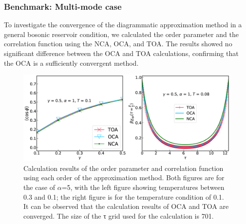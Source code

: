 \documentclass{article}[12pt]
\begin{document}
\begin{spacing}{1.5}
\subsubsection*{Benchmark: Multi-mode case}
To investigate the convergence of the diagrammatic approximation method in a general bosonic reservoir condition, 
we calculated the order parameter and the correlation function using the NCA, OCA, and TOA. 
The results showed no significant difference between the OCA and TOA calculations, confirming that the OCA is a sufficiently convergent method.
\begin{figure}[H]
  \centerline{\includegraphics[width=15cm]{TexFigure/4/4_1_02_Multi.png}}
  \caption{ Calculation results of the order parameter and correlation function using each order of the approximation method. 
  Both figures are for the case of $\alpha$=5, with the left figure showing temperatures between 0.3 and 0.1; the right figure is for the temperature condition of 0.1. It can be observed that the calculation results of OCA and TOA are converged. 
  The size of the τ grid used for the calculation is 701.}
 \end{figure}

\end{spacing}
\end{document}
